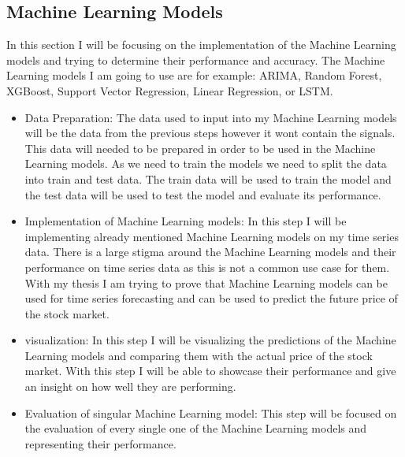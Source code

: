 \documentclass{imc-inf}
\begin{document}
	\subsection{Machine Learning Models}
	In this section I will be focusing on the implementation of the Machine Learning models and trying to determine their performance and accuracy.
	The Machine Learning models I am going to use are for example: ARIMA, Random Forest, XGBoost, Support Vector Regression, Linear Regression, or LSTM.
	\begin{itemize}
		\item Data Preparation: The data used to input into my Machine Learning models will be the data from the previous steps however it wont contain the signals.
		This data will needed to be prepared in order to be used in the Machine Learning models. As we need to train the models we need to split the data into train and test data. 
		The train data will be used to train the model and the test data will be used to test the model and evaluate its performance. 
		\item Implementation of Machine Learning models: In this step I will be implementing already mentioned Machine Learning models on my time series data. 
		There is a large stigma around the Machine Learning models and their performance on time series data as this is not a common use case for them. 
		With my thesis I am trying to prove that Machine Learning models can be used for time series forecasting and can be used to predict the future price of the stock market.
		\item visualization:  In this step I will be visualizing the predictions of the Machine Learning models and comparing them with the actual price of the stock market.
		With this step I will be able to showcase their performance and give an insight on how well they are performing.
		\item Evaluation of singular Machine Learning model: This step will be focused on the evaluation of every single one of the Machine Learning models and representing their performance. 
	\end{itemize}
	
\end{document}
